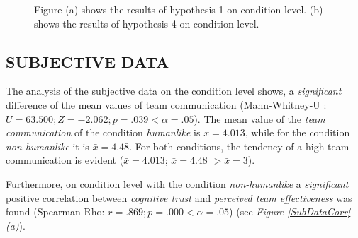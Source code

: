 \documentclass[sigchi]{acmart}
\begin{document}
\begin{figure}[]
  \centering
  \qquad
  \caption[Results of hypothesis 1 and 4]{Figure (a) shows the results of hypothesis 1 on condition level. (b) shows the results of hypothesis 4 on condition level.}
  \label{H1H4}
\end{figure}

\newpage
\subsection{SUBJECTIVE DATA}
The analysis of the subjective data on the condition level shows, a \textit{significant} difference of the mean values of team communication (Mann-Whitney-U : $U = 63.500; Z = -2.062; p =.039 < \alpha = .05$). The mean value of the \textit{team communication} of the condition \textit{humanlike} is $\bar{x} = 4.013$, while for the condition \textit{non-humanlike} it is  $\bar{x} = 4.48$. For both conditions, the tendency of a high team communication is evident ($\bar{x} = 4.013$; $\bar{x} = 4.48$ $ > \bar{x} = 3$).

Furthermore, on condition level with the condition \textit{non-humanlike} a \textit{significant} positive correlation between \textit{cognitive trust} and \textit{perceived team effectiveness} was found (Spearman-Rho: $r =.869; p =.000 < \alpha = .05$) (see \textit{Figure \ref{SubDataCorr} (a)}).
\end{document}
